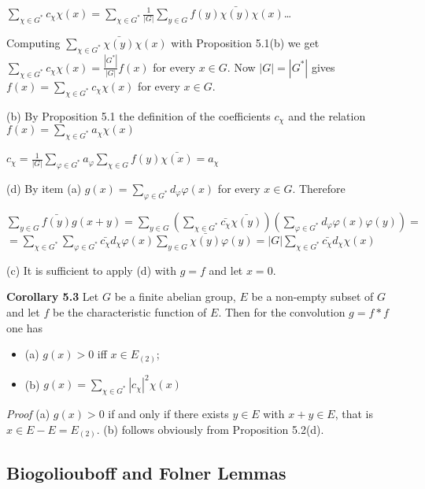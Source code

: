 \documentclass[12pt]{article}
\begin{document}
    $\sum_{\chi \in G^*} c_\chi \chi(x) = \sum_{\chi \in G^*} \frac{1}{|G|} \sum_{y \in G} f(y) \bar{\chi(y)} \chi(x)$\dots


    Computing $\sum_{\chi \in G^*} \bar{\chi (y)} \chi(x)$ with Proposition 5.1(b) we get $\sum_{\chi \in G^*} c_\chi \chi(x) = \frac{|G^*|}{|G|}f(x)$ for every $x \in G$. Now
$|G| = |G^*|$ gives $f(x) = \sum_{\chi \in G^*} c_\chi \chi(x)$ for every $x \in G$.


    (b) By Proposition 5.1 the definition of the coefficients $c_\chi$ and the relation $f(x) = \sum_{\chi \in G^*} a_\chi \chi(x)$


        $c_\chi = \frac{1}{|G|} \sum_{\varphi \in G^*} a_\varphi \sum_{\chi \in G} f(y)\bar{\chi(x)} = a_\chi$


    (d) By item (a) $g(x) = \sum_{\varphi \in G^*} d_\varphi \varphi(x)$ for every $x \in G$. Therefore
    

        $\sum_{y \in G} \bar{f(y)} g(x+y) = \sum_{y \in G} (\sum_{\chi \in G^*} \bar{c_\chi} \bar{\chi(y)}) (\sum_{\varphi \in G^*} d_\varphi \varphi(x) \varphi(y)) = $
            $ = \sum_{\chi \in G^*} \sum_{\varphi \in G^*} \bar{c_\chi} d_\chi \varphi(x) \sum_{y \in G} \bar{\chi(y)} \varphi(y) = |G| \sum_{\chi \in G^*} \bar{c_\chi} d_\chi \chi(x)$


    (c) It is sufficient to apply (d) with $g = f$ and let $x = 0$.


\textbf{Corollary 5.3} Let $G$ be a finite abelian group, $E$ be a non-empty subset of $G$ and let $f$ be the characteristic
function of $E$. Then for the convolution $g = f * f$ one has


    \begin{itemize}

        \item (a) $g(x) > 0$ iff $x \in E_{(2)}$;
        
        \item (b) $g(x) = \sum_{\chi \in G^*} |c_\chi|^2 \chi(x)$

    \end{itemize}


\emph{Proof} (a) $g(x) > 0$ if and only if there exists $y \in E$ with $x + y \in E$, that is $x \in E - E = E_{(2)}$.
(b) follows obviously from Proposition 5.2(d).


\subsection{Biogoliouboff and Folner Lemmas}
\end{document}
